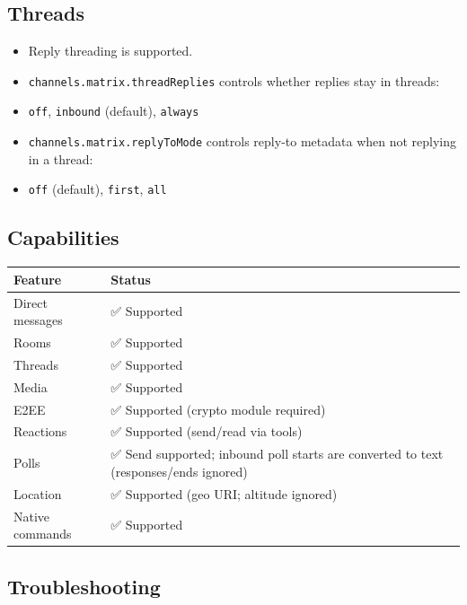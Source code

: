 \subsection{Threads}


\begin{itemize}
  \item Reply threading is supported.
  \item \texttt{channels.matrix.threadReplies} controls whether replies stay in threads:
  \item \texttt{off}, \texttt{inbound} (default), \texttt{always}
  \item \texttt{channels.matrix.replyToMode} controls reply-to metadata when not replying in a thread:
  \item \texttt{off} (default), \texttt{first}, \texttt{all}
\end{itemize}


\subsection{Capabilities}



\begin{table}[h]
\centering
\small
\begin{tabular}{|l|l|}
\hline
Feature & Status \\
\hline
Direct messages & ✅ Supported \\
\hline
Rooms & ✅ Supported \\
\hline
Threads & ✅ Supported \\
\hline
Media & ✅ Supported \\
\hline
E2EE & ✅ Supported (crypto module required) \\
\hline
Reactions & ✅ Supported (send/read via tools) \\
\hline
Polls & ✅ Send supported; inbound poll starts are converted to text (responses/ends ignored) \\
\hline
Location & ✅ Supported (geo URI; altitude ignored) \\
\hline
Native commands & ✅ Supported \\
\hline
\end{tabular}
\end{table}



\subsection{Troubleshooting}


